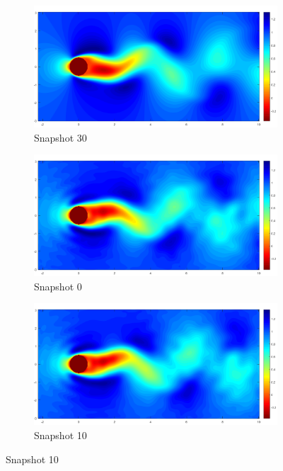 \documentclass[letterpaper,12pt,peerreviewca,draftcls]{IEEEtran}
\begin{document}
\begin{figure}[h]
\begin{subfigure}[t]{0.23\textwidth}
	\end{subfigure}
	\begin{subfigure}[t]{0.23\textwidth}
		\includegraphics[width=\linewidth]{"Figure S6d"}
		\caption{Snapshot 30}
	\end{subfigure}
	\begin{subfigure}[t]{0.23\textwidth}
		\includegraphics[width=\linewidth]{"Figure S6e"}
		\caption{Snapshot 0}
	\end{subfigure}
	\begin{subfigure}[t]{0.23\textwidth}
		\includegraphics[width=\linewidth]{"Figure S6f"}
		\caption{Snapshot 10}
	\end{subfigure}

\end{figure}
\end{document}
